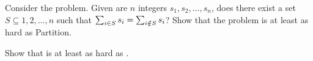 \begin{exercise}
Consider the  problem. Given are $n$ integers $s_1,s_2,\ldots,s_n$, does there exist a set $S\subseteq{1,2,\ldots,n}$ such that $\isumdomain[i]{S}{s_i}=\isumndomain[i]{S}{s_i}$? Show that the  problem is at least as hard as Partition.
\end{exercise}
\begin{exercise}
Show that  is at least as hard as .
\end{exercise}